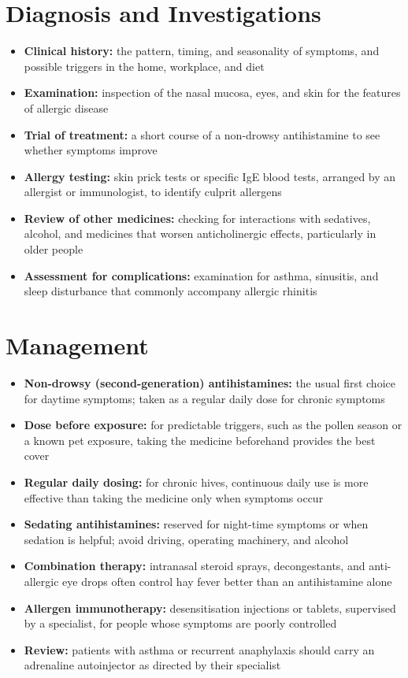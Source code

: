 \section*{Diagnosis and Investigations}
\begin{itemize}
    \item \textbf{Clinical history:} the pattern, timing, and seasonality of symptoms, and possible triggers in the home, workplace, and diet
    \item \textbf{Examination:} inspection of the nasal mucosa, eyes, and skin for the features of allergic disease
    \item \textbf{Trial of treatment:} a short course of a non-drowsy antihistamine to see whether symptoms improve
    \item \textbf{Allergy testing:} skin prick tests or specific IgE blood tests, arranged by an allergist or immunologist, to identify culprit allergens
    \item \textbf{Review of other medicines:} checking for interactions with sedatives, alcohol, and medicines that worsen anticholinergic effects, particularly in older people
    \item \textbf{Assessment for complications:} examination for asthma, sinusitis, and sleep disturbance that commonly accompany allergic rhinitis
\end{itemize}

\section*{Management}
\begin{itemize}
    \item \textbf{Non-drowsy (second-generation) antihistamines:} the usual first choice for daytime symptoms; taken as a regular daily dose for chronic symptoms
    \item \textbf{Dose before exposure:} for predictable triggers, such as the pollen season or a known pet exposure, taking the medicine beforehand provides the best cover
    \item \textbf{Regular daily dosing:} for chronic hives, continuous daily use is more effective than taking the medicine only when symptoms occur
    \item \textbf{Sedating antihistamines:} reserved for night-time symptoms or when sedation is helpful; avoid driving, operating machinery, and alcohol
    \item \textbf{Combination therapy:} intranasal steroid sprays, decongestants, and anti-allergic eye drops often control hay fever better than an antihistamine alone
    \item \textbf{Allergen immunotherapy:} desensitisation injections or tablets, supervised by a specialist, for people whose symptoms are poorly controlled
    \item \textbf{Review:} patients with asthma or recurrent anaphylaxis should carry an adrenaline autoinjector as directed by their specialist
\end{itemize}

